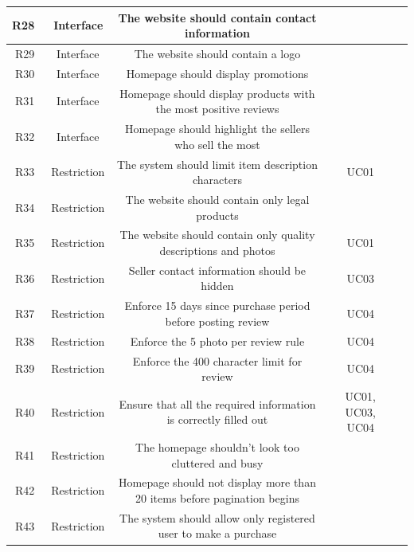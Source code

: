 \documentclass[11pt]{article}
\newcounter{use case ID}
\newcounter{req ID}
\begin{document}
\begin{table}[H]
\begin{adjustbox}{width=\columnwidth,center}
\begin{tabular}{|r | c| c | c| c|}
                \hline
                R28 & \ Interface & The website should contain contact information & &  \\
                \hline
                R29 & \ Interface & The website should contain a logo & &  \\
                \hline
                R30 & \ Interface & Homepage should display promotions & &  \\
                \hline
                R31 & \ Interface & Homepage should display products with the most positive reviews & &  \\
                \hline
                R32 & \ Interface & Homepage should highlight the sellers who sell the most & &  \\
                \hline
                R33 & \ Restriction & The system should limit item description characters & UC01 &  \\
                \hline
                R34 & \ Restriction & The website should contain only legal products & &  \\
                \hline
                R35 & \ Restriction & The website should contain only quality descriptions and photos & UC01 &  \\
                \hline
                R36 & \ Restriction & Seller contact information should be hidden & UC03 &  \\
                \hline
                R37 & \ Restriction & Enforce 15 days since purchase period before posting review & UC04 &  \\
                \hline
                R38 & \ Restriction & Enforce the 5 photo per review rule & UC04 &  \\
                \hline
                R39 & \ Restriction & Enforce the 400 character limit for review & UC04 &  \\
                \hline
                R40 & \ Restriction & Ensure that all the required information is correctly filled out & UC01, UC03, UC04 &  \\
                \hline
                R41 & \ Restriction & The homepage shouldn't look too cluttered and busy & &  \\
                \hline
                R42 & \ Restriction & Homepage should not display more than 20 items before pagination begins & &  \\
                \hline
                R43 & \ Restriction & The system should allow only registered user to make a purchase & &  \\

\end{tabular}
\end{adjustbox}
\end{table}
\end{document}

